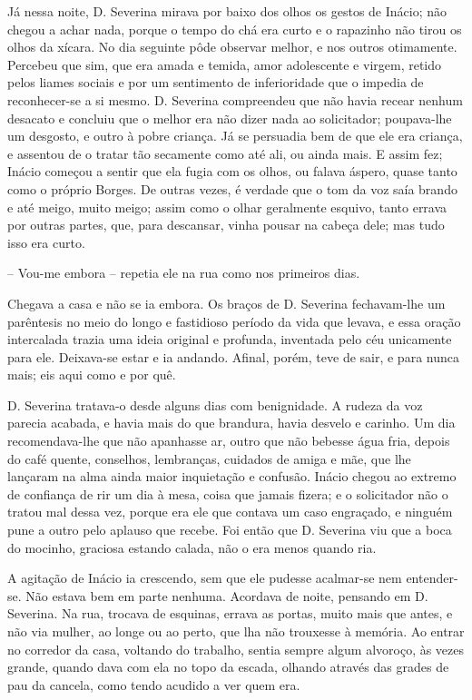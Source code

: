 Já nessa noite, D. Severina mirava por baixo dos olhos os gestos de
Inácio; não chegou a achar nada, porque o tempo do chá era curto e o
rapazinho não tirou os olhos da xícara. No dia seguinte pôde observar
melhor, e nos outros otimamente. Percebeu que sim, que era amada e
temida, amor adolescente e virgem, retido pelos liames sociais e por um
sentimento de inferioridade que o impedia de reconhecer-se a si mesmo.
D. Severina compreendeu que não havia recear nenhum desacato e concluiu
que o melhor era não dizer nada ao solicitador; poupava-lhe um desgosto,
e outro à pobre criança. Já se persuadia bem de que ele era criança, e
assentou de o tratar tão secamente como até ali, ou ainda mais. E assim
fez; Inácio começou a sentir que ela fugia com os olhos, ou falava
áspero, quase tanto como o próprio Borges. De outras vezes, é verdade
que o tom da voz saía brando e até meigo, muito meigo; assim como o
olhar geralmente esquivo, tanto errava por outras partes, que, para
descansar, vinha pousar na cabeça dele; mas tudo isso era curto.

-- Vou-me embora -- repetia ele na rua como nos primeiros dias.

Chegava a casa e não se ia embora. Os braços de D. Severina fechavam-lhe
um parêntesis no meio do longo e fastidioso período da vida que levava,
e essa oração intercalada trazia uma ideia original e profunda,
inventada pelo céu unicamente para ele. Deixava-se estar e ia andando.
Afinal, porém, teve de sair, e para nunca mais; eis aqui como e por quê.

D. Severina tratava-o desde alguns dias com benignidade. A rudeza da voz
parecia acabada, e havia mais do que brandura, havia desvelo e carinho.
Um dia recomendava-lhe que não apanhasse ar, outro que não bebesse água
fria, depois do café quente, conselhos, lembranças, cuidados de amiga e
mãe, que lhe lançaram na alma ainda maior inquietação e confusão. Inácio
chegou ao extremo de confiança de rir um dia à mesa, coisa que jamais
fizera; e o solicitador não o tratou mal dessa vez, porque era ele que
contava um caso engraçado, e ninguém pune a outro pelo aplauso que
recebe. Foi então que D. Severina viu que a boca do mocinho, graciosa
estando calada, não o era menos quando ria.

A agitação de Inácio ia crescendo, sem que ele pudesse acalmar-se nem
entender-se. Não estava bem em parte nenhuma. Acordava de noite,
pensando em D. Severina. Na rua, trocava de esquinas, errava as portas,
muito mais que antes, e não via mulher, ao longe ou ao perto, que lha
não trouxesse à memória. Ao entrar no corredor da casa, voltando do
trabalho, sentia sempre algum alvoroço, às vezes grande, quando dava com
ela no topo da escada, olhando através das grades de pau da cancela,
como tendo acudido a ver quem era.


